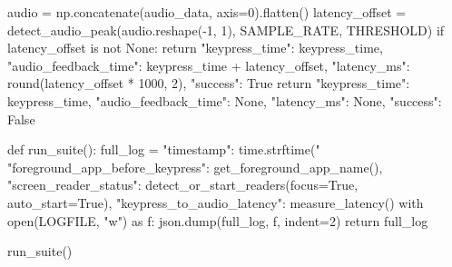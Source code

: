 \begin{pyverbatim}
    audio = np.concatenate(audio_data, axis=0).flatten()
    latency_offset = detect_audio_peak(audio.reshape(-1, 1), SAMPLE_RATE, THRESHOLD)
    if latency_offset is not None:
        return {
            "keypress_time": keypress_time,
            "audio_feedback_time": keypress_time + latency_offset,
            "latency_ms": round(latency_offset * 1000, 2),
            "success": True
        }
    return {
        "keypress_time": keypress_time,
        "audio_feedback_time": None,
        "latency_ms": None,
        "success": False
    }

def run_suite():
    full_log = {
        "timestamp": time.strftime("%
        "foreground_app_before_keypress": get_foreground_app_name(),
        "screen_reader_status": detect_or_start_readers(focus=True, auto_start=True),
        "keypress_to_audio_latency": measure_latency()
    }
    with open(LOGFILE, "w") as f:
        json.dump(full_log, f, indent=2)
    return full_log

run_suite()
\end{pyverbatim}

